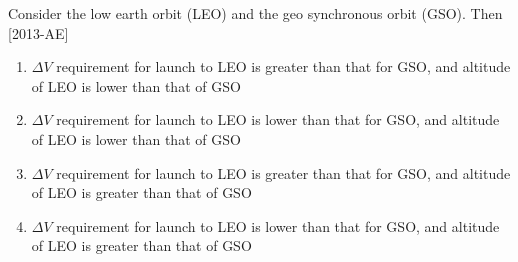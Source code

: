     \item Consider the low earth orbit (LEO) and the geo synchronous orbit (GSO). Then  \hfill{[2013-AE]}

    \begin{enumerate}
        \item $\Delta V$ requirement for launch to LEO is greater than that for GSO, and altitude of LEO is lower than that of GSO 
        \item $\Delta V$ requirement for launch to LEO is lower than that for GSO, and altitude of LEO is lower than that of GSO         
        \item $\Delta V$ requirement for launch to LEO is greater than that for GSO, and altitude of LEO is greater than that of GSO 
        \item $\Delta V$ requirement for launch to LEO is lower than that for GSO, and altitude of LEO is greater than that of GSO         
    \end{enumerate}

